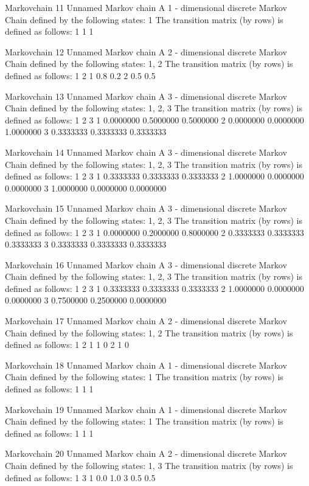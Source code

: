 \documentclass[
  nojss]{jss}
\begin{document}
\begin{CodeChunk}
\begin{CodeOutput}
Markovchain  11 
Unnamed Markov chain 
 A  1 - dimensional discrete Markov Chain defined by the following states: 
 1 
 The transition matrix  (by rows)  is defined as follows: 
  1
1 1

Markovchain  12 
Unnamed Markov chain 
 A  2 - dimensional discrete Markov Chain defined by the following states: 
 1, 2 
 The transition matrix  (by rows)  is defined as follows: 
    1   2
1 0.8 0.2
2 0.5 0.5

Markovchain  13 
Unnamed Markov chain 
 A  3 - dimensional discrete Markov Chain defined by the following states: 
 1, 2, 3 
 The transition matrix  (by rows)  is defined as follows: 
          1         2         3
1 0.0000000 0.5000000 0.5000000
2 0.0000000 0.0000000 1.0000000
3 0.3333333 0.3333333 0.3333333

Markovchain  14 
Unnamed Markov chain 
 A  3 - dimensional discrete Markov Chain defined by the following states: 
 1, 2, 3 
 The transition matrix  (by rows)  is defined as follows: 
          1         2         3
1 0.3333333 0.3333333 0.3333333
2 1.0000000 0.0000000 0.0000000
3 1.0000000 0.0000000 0.0000000

Markovchain  15 
Unnamed Markov chain 
 A  3 - dimensional discrete Markov Chain defined by the following states: 
 1, 2, 3 
 The transition matrix  (by rows)  is defined as follows: 
          1         2         3
1 0.0000000 0.2000000 0.8000000
2 0.3333333 0.3333333 0.3333333
3 0.3333333 0.3333333 0.3333333

Markovchain  16 
Unnamed Markov chain 
 A  3 - dimensional discrete Markov Chain defined by the following states: 
 1, 2, 3 
 The transition matrix  (by rows)  is defined as follows: 
          1         2         3
1 0.3333333 0.3333333 0.3333333
2 1.0000000 0.0000000 0.0000000
3 0.7500000 0.2500000 0.0000000

Markovchain  17 
Unnamed Markov chain 
 A  2 - dimensional discrete Markov Chain defined by the following states: 
 1, 2 
 The transition matrix  (by rows)  is defined as follows: 
  1 2
1 1 0
2 1 0

Markovchain  18 
Unnamed Markov chain 
 A  1 - dimensional discrete Markov Chain defined by the following states: 
 1 
 The transition matrix  (by rows)  is defined as follows: 
  1
1 1

Markovchain  19 
Unnamed Markov chain 
 A  1 - dimensional discrete Markov Chain defined by the following states: 
 1 
 The transition matrix  (by rows)  is defined as follows: 
  1
1 1

Markovchain  20 
Unnamed Markov chain 
 A  2 - dimensional discrete Markov Chain defined by the following states: 
 1, 3 
 The transition matrix  (by rows)  is defined as follows: 
    1   3
1 0.0 1.0
3 0.5 0.5


\end{CodeOutput}
\end{CodeChunk}
\end{document}
